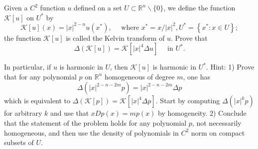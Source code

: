 
\begin{problem}
	Given a $C^2$ function $u$ defined on a set $U \subset \mathbb{R}^n \backslash\{0\}$, we define the function $\mathcal{K}[u]$ on $U^*$ by
\[
\mathcal{K}[u](x)=|x|^{2-n} u\left(x^*\right), \quad \text { where } x^*=x /|x|^2, U^*=\left\{x^*: x \in U\right\} ;
\]
the function $\mathcal{K}[u]$ is called the Kelvin transform of $u$. Prove that
\[
\Delta(\mathcal{K}[u])=\mathcal{K}\left[|x|^4 \Delta u\right] \quad \text { in } U^* .
\]

In particular, if $u$ is harmonic in $U$, then $\mathcal{K}[u]$ is harmonic in $U^*$.
Hint: 1) Prove that for any polynomial $p$ on $\mathbb{R}^n$ homogeneous of degree $m$, one has
\[
\Delta\left(|x|^{2-n-2 m} p\right)=|x|^{2-n-2 m} \Delta p
\]
which is equivalent to $\Delta(\mathcal{K}[p])=\mathcal{K}\left[|x|^4 \Delta p\right]$. Start by computing $\Delta\left(|x|^k p\right)$ for arbitrary $k$ and use that $x D p(x)=m p(x)$ by homogeneity. 2) Conclude that the statement of the problem holds for any polynomial $p$, not necessarily homogeneous, and then use the density of polynomials in $C^2$ norm on compact subsets of $U$.
\end{problem}

